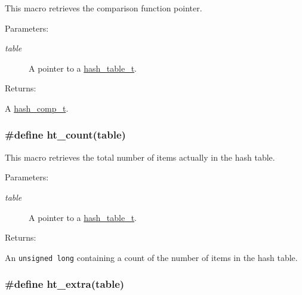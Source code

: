 This macro retrieves the comparison function pointer.\begin{Desc}
\item[Parameters: ]\par
\begin{description}
\item[{\em 
table}]A pointer to a \hyperlink{group__dbprim__hash_a0}{hash\_\-table\_\-t}.\end{description}
\end{Desc}
\begin{Desc}
\item[Returns: ]\par
A \hyperlink{group__dbprim__hash_a4}{hash\_\-comp\_\-t}. \end{Desc}
\hypertarget{group__dbprim__hash_a23}{
\subsubsection[ht\_\-count]{\setlength{\rightskip}{0pt plus 5cm}\#define ht\_\-count(table)}}
\label{group__dbprim__hash_a23}


This macro retrieves the total number of items actually in the hash table.\begin{Desc}
\item[Parameters: ]\par
\begin{description}
\item[{\em 
table}]A pointer to a \hyperlink{group__dbprim__hash_a0}{hash\_\-table\_\-t}.\end{description}
\end{Desc}
\begin{Desc}
\item[Returns: ]\par
An {\tt unsigned long} containing a count of the number of items in the hash table. \end{Desc}
\hypertarget{group__dbprim__hash_a27}{
\subsubsection[ht\_\-extra]{\setlength{\rightskip}{0pt plus 5cm}\#define ht\_\-extra(table)}}
\label{group__dbprim__hash_a27}


